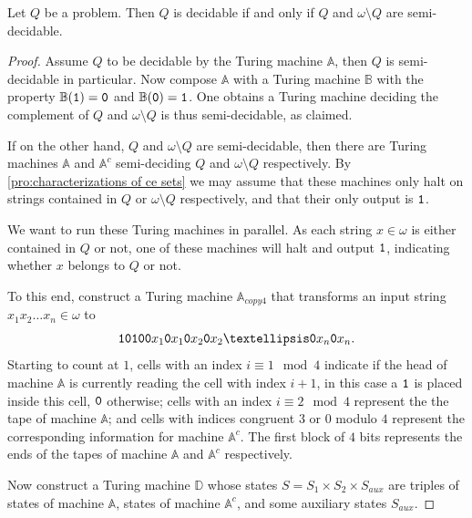 \begin{pro}\label{pro:Posts theorem}
  Let \(Q\) be a problem. Then \(Q\) is decidable if and only if \(Q\) and \(ω
  \setminus Q\) are semi-decidable.
\end{pro}
\begin{proof}
  Assume \(Q\) to be decidable by the Turing machine \(\mathbb{A}\), then \(Q\)
  is semi-decidable in particular. Now compose \(\mathbb{A}\) with a Turing
  machine \(\mathbb{B}\) with the property \(\mathbb{B}(\mathtt{1}) = \mathtt{0}\) and
  \(\mathbb{B}(\mathtt{0}) = \mathtt{1}\). One obtains a Turing machine deciding the
  complement of \(Q\) and \(ω \setminus Q\) is thus semi-decidable, as claimed.

  If on the other hand, \(Q\) and \(ω \setminus Q\) are semi-decidable, then
  there are Turing machines \(\mathbb{A}\) and \(\mathbb{A}^c\) semi-deciding
  \(Q\) and \(ω \setminus Q\) respectively. By \cref{pro:characterizations of ce
  sets} we may assume that these machines only halt on strings contained in
  \(Q\) or \(ω \setminus Q\) respectively, and that their only output is
  \(\mathtt{1}\).

  We want to run these Turing machines in parallel. As each string \(x ∈ ω\) is
  either contained in \(Q\) or not, one of these machines will halt and output
  \(\mathtt{1}\), indicating whether \(x\) belongs to \(Q\) or not.

  To this end, construct a Turing machine \(\mathbb{A}_{copy4}\) that transforms
  an input string \(x_1x_2 … x_n ∈ ω\) to
  \[
    \one\zer\one\zer \zer x_1 \zer x_1 \zer x_2 \zer x_2 … \zer x_n \zer x_n.
  \]
  Starting to count at \(1\), cells with an index \(i \equiv 1 \mod 4\) indicate
  if the head of machine \(\mathbb{A}\) is currently reading the cell with index
  \(i + 1\), in this case a \(\mathtt{1}\) is placed inside this cell, \(\mathtt{0}\)
  otherwise; cells with an index \(i \equiv 2 \mod 4\) represent the the tape
  of machine \(\mathbb{A}\); and cells with indices congruent \(3\) or \(0\)
  modulo \(4\) represent the corresponding information for machine
  \(\mathbb{A}^c\). The first block of \(4\) bits represents the ends of the
  tapes of machine \(\mathbb{A}\) and \(\mathbb{A}^c\) respectively.

  Now construct a Turing machine \(\mathbb{D}\) whose states \(S = S_1 \times
  S_2 \times S_{aux}\) are triples of states of machine \(\mathbb{A}\), states
  of machine \(\mathbb{A}^c\), and some auxiliary states \(S_{aux}\).


\end{proof}
